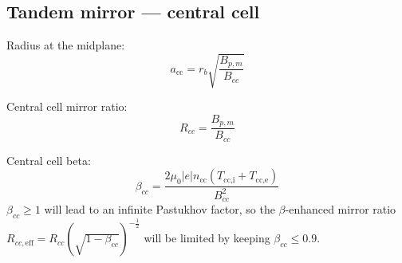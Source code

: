 \subsection{Tandem mirror — central cell}

Radius at the midplane:
\begin{equation}
    a_{\text{cc}} = r_b \sqrt{\frac{B_{p,m}}{B_{cc}}}
\end{equation}

Central cell mirror ratio:
\begin{equation}
    R_{cc} = \frac{B_{p,m}}{B_{cc}}
\end{equation}

Central cell beta:
\begin{equation}
    \beta_{cc} = \frac{2\mu_0 |e| n_{\text{cc}} \left(T_{\text{cc,i}} + T_\text{cc,e} \right)}{ B_{cc}^2}
\end{equation}
$\beta_{cc} \geq 1$ will lead to an infinite Pastukhov factor, so the $\beta$-enhanced mirror ratio $R_{cc, \text{eff}} = R_{cc} \left( \sqrt{1 - \beta_{cc}} \right)^{-\frac{1}{2}}$ will be limited by keeping $\beta_{cc} \leq 0.9$.

